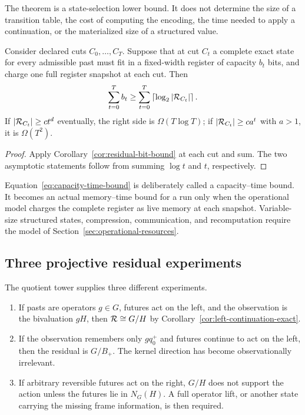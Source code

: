 The theorem is a state-selection lower bound.  It does not determine the size
of a transition table, the cost of computing the encoding, the time needed to
apply a continuation, or the materialized size of a structured value.

\begin{corollary}
\label{cor:capacity-time-bound}
Consider declared cuts $C_0,\ldots,C_T$.  Suppose that at cut $C_t$ a complete
exact state for every admissible past must fit in a fixed-width register of
capacity $b_t$ bits, and charge one full register snapshot at each cut.  Then
\begin{equation}
  \sum_{t=0}^{T} b_t
  \ge
  \sum_{t=0}^{T}
  \left\lceil\log_2|\mathcal R_{C_t}|\right\rceil.
  \label{eq:capacity-time-bound}
\end{equation}
If $|\mathcal R_{C_t}|\ge c t^d$ eventually, the right side is
$\Omega(T\log T)$; if $|\mathcal R_{C_t}|\ge c a^t$ with $a>1$, it is
$\Omega(T^2)$.
\end{corollary}

\begin{proof}
Apply Corollary~\ref{cor:residual-bit-bound} at each cut and sum.  The two
asymptotic statements follow from summing $\log t$ and $t$, respectively.
\end{proof}

Equation~\eqref{eq:capacity-time-bound} is deliberately called a
capacity--time bound.  It becomes an actual memory--time bound for a run only
when the operational model charges the complete register as live memory at
each snapshot.  Variable-size structured states, compression, communication,
and recomputation require the model of Section~\ref{sec:operational-resources}.

\subsection{Three projective residual experiments}

The quotient tower supplies three different experiments.

\begin{enumerate}
  \item If pasts are operators $g\in G$, futures act on the left, and the
  observation is the bivaluation $gH$, then
  $\mathcal R\cong G/H$ by Corollary~\ref{cor:left-continuation-exact}.

  \item If the observation remembers only $gq_0^+$ and futures continue to act
  on the left, then the residual is $G/B_+$.  The kernel direction has become
  observationally irrelevant.

  \item If arbitrary reversible futures act on the right, $G/H$ does not
  support the action unless the futures lie in $N_G(H)$.  A full operator lift,
  or another state carrying the missing frame information, is then required.
\end{enumerate}

